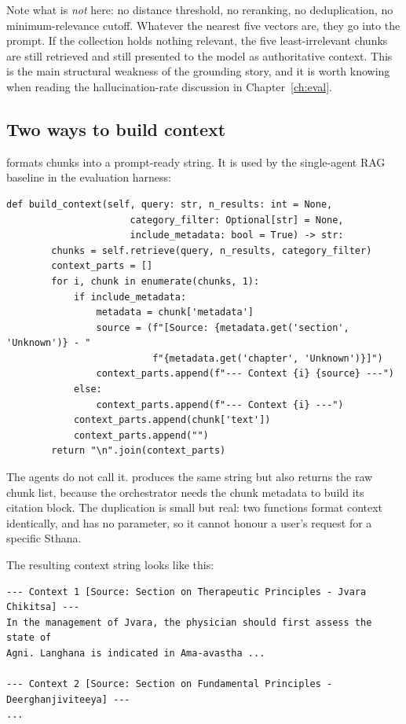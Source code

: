 Note what is \emph{not} here: no distance threshold, no reranking, no deduplication, no minimum-relevance cutoff. Whatever the nearest five vectors are, they go into the prompt. If the collection holds nothing relevant, the five least-irrelevant chunks are still retrieved and still presented to the model as authoritative context. This is the main structural weakness of the grounding story, and it is worth knowing when reading the hallucination-rate discussion in Chapter~\ref{ch:eval}.

\subsection{Two ways to build context}

 formats chunks into a prompt-ready string. It is used by the single-agent RAG baseline in the evaluation harness:

\begin{lstlisting}[style=py,firstnumber=32]
    def build_context(self, query: str, n_results: int = None,
                      category_filter: Optional[str] = None,
                      include_metadata: bool = True) -> str:
        chunks = self.retrieve(query, n_results, category_filter)
        context_parts = []
        for i, chunk in enumerate(chunks, 1):
            if include_metadata:
                metadata = chunk['metadata']
                source = (f"[Source: {metadata.get('section', 'Unknown')} - "
                          f"{metadata.get('chapter', 'Unknown')}]")
                context_parts.append(f"--- Context {i} {source} ---")
            else:
                context_parts.append(f"--- Context {i} ---")
            context_parts.append(chunk['text'])
            context_parts.append("")
        return "\n".join(context_parts)
\end{lstlisting}

The agents do not call it.  produces the same string but also returns the raw chunk list, because the orchestrator needs the chunk metadata to build its citation block. The duplication is small but real: two functions format context identically, and  has no  parameter, so it cannot honour a user's request for a specific Sthana.

The resulting context string looks like this:

\begin{lstlisting}[style=plain]
--- Context 1 [Source: Section on Therapeutic Principles - Jvara Chikitsa] ---
In the management of Jvara, the physician should first assess the state of
Agni. Langhana is indicated in Ama-avastha ...

--- Context 2 [Source: Section on Fundamental Principles - Deerghanjiviteeya] ---
...
\end{lstlisting}

